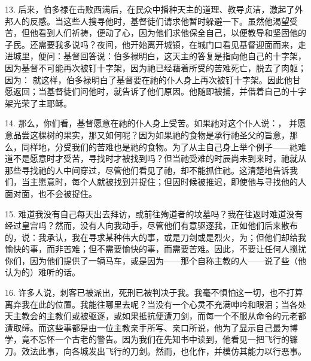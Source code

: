 13. 后来，伯多禄在击败西满后，在民众中播种天主的道理、教导贞洁，激起了外邦人的反感。当这些人搜寻他时，基督徒们请求他暂时躲避一下。虽然他渴望受苦，但他看到人们祈祷，便动了心，因为他们求他保全自己，以便教导和坚固他的子民。还需要我多说吗？夜间，他开始离开城镇，在城门口看见基督迎面而来，走进城里，便问：基督回答说：伯多禄明白，这天主的答复是指向他自己的十字架，因为基督不可能再次被钉十字架，因为祂已经藉着所受的苦难死亡，脱去了肉躯；因为： 就这样，伯多禄明白了基督要在祂的仆人身上再次被钉十字架。因此他甘愿返回；当基督徒们问他时，就告诉了他们原因。他随即被捕，并借着自己的十字架光荣了主耶稣。\par

14. 那么，你们看，基督愿意在祂的仆人身上受苦。如果祂对这个仆人说：， 并愿意品尝这棵树的果实，那又如何呢？因为如果祂的食物是承行祂圣父的旨意，那么，同样地，分受我们的苦难也是祂的食物。为了从主自己身上举个例子——祂难道不是愿意时才受苦，寻找时才被找到吗？但当祂受难的时辰尚未到来时，祂就从那些寻找祂的人中间穿过，尽管他们看见了祂，却不能抓住祂。这清楚地告诉我们，当主愿意时，每个人就被找到并捉住；但因时候被推迟，即使他与寻找他的人面对面，也不会被捉住。\par

15. 难道我没有自己每天出去拜访，或前往殉道者的坟墓吗？我在往返时难道没有经过皇宫吗？然而，没有人向我动手，尽管他们有意驱逐我，正如他们后来散布的，说：我承认，我在寻求某种伟大的事，或是刀剑或是烈火，为；但他们却给我愉快的事，而非苦难；但不需要愉快的事，而需要苦难。因此，不要让任何人搅扰你们，因为他们提供了一辆马车，或是因为——那个自称主教的人——说了些（他认为的）难听的话。\par

16. 许多人说，刺客已被派出，死刑已被判决于我。我毫不惧怕这一切，也不打算离弃我在此的位置。我能往哪里去呢？当没有一个心灵不充满呻吟和眼泪；当各处天主教会的主教们或被驱逐，或如果抵抗便遭刀剑，而每一个不服从命令的元老都遭取缔。而这些事都是由一位主教亲手所写、亲口所说，他为了显示自己最为博学，竟不忘怀一个古老的警告。因为我们在先知书中读到，他看见一把飞行的镰刀。效法此事，向各城发出飞行的刀剑。然而，也化作，并模仿其能力以行恶事。\par

